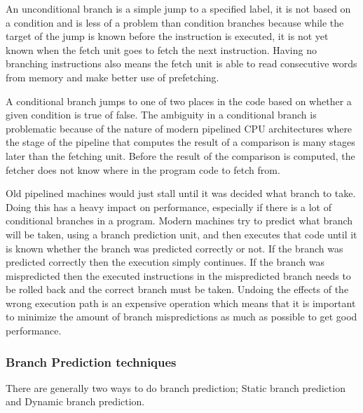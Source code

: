 An unconditional branch is a simple jump to a specified label, it is not based on a condition and is less of a problem than condition branches because while the target of the jump is known before the instruction is executed, it is not yet known when the fetch unit goes to fetch the next instruction.
Having no branching instructions also means the fetch unit is able to read consecutive words from memory and make better use of prefetching.

A conditional branch jumps to one of two places in the code based on whether a given condition is true of false.
The ambiguity in a conditional branch is problematic because of the nature of modern pipelined CPU architectures where the stage of the pipeline that computes the result of a comparison is many stages later than the fetching unit.
Before the result of the comparison is computed, the fetcher does not know where in the program code to fetch from.

Old pipelined machines would just stall until it was decided what branch to take. 
Doing this has a heavy impact on performance, especially if there is a lot of conditional branches in a program.
Modern machines try to predict what branch will be taken, using a branch prediction unit, and then executes that code until it is known whether the branch was predicted correctly or not. 
If the branch was predicted correctly then the execution simply continues.
If the branch was mispredicted then the executed instructions in the mispredicted branch needs to be rolled back and the correct branch must be taken. 
Undoing the effects of the wrong execution path is an expensive operation which means that it is important to minimize the amount of branch mispredictions as much as possible to get good performance.

\subsubsection{Branch Prediction techniques}
There are generally two ways to do branch prediction; Static branch prediction and Dynamic branch prediction.

